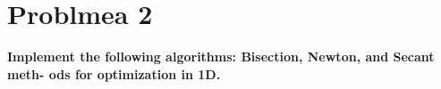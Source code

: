 \section*{Problmea 2}
\textbf{Implement the following algorithms: Bisection, Newton, and Secant meth-
    ods for optimization in 1D.}